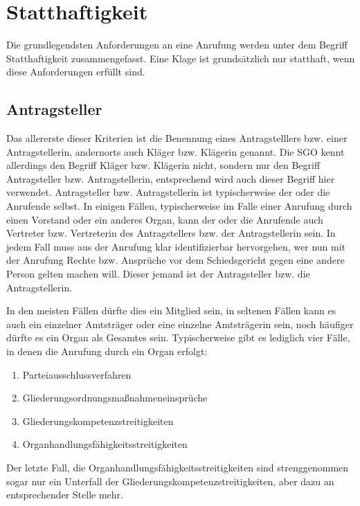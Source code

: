 \section{Statthaftigkeit}
\label{Anrufung:Statthaftigkeit}
Die grundlegendsten Anforderungen an eine Anrufung werden unter dem Begriff Statthaftigkeit zusammengefasst.
Eine Klage ist grundsätzlich nur statthaft, wenn diese Anforderungen erfüllt sind.

\subsection{Antragsteller}
\label{Anrufung:Statthaftigkeit:Antragsteller}
Das allererste dieser Kriterien ist die Benennung eines  Antragstelllers bzw. einer Antragstellerin, andernorts auch Kläger bzw. Klägerin genannt.
Die SGO kennt allerdings den Begriff Kläger bzw. Klägerin nicht, sondern nur den Begriff Antragsteller bzw. Antragstellerin, entsprechend wird auch dieser Begriff hier verwendet.
Antragsteller bzw. Antragstellerin ist typischerweise der oder die Anrufende selbst.
In einigen Fällen, typischerweise im Falle einer Anrufung durch einen Vorstand oder ein anderes Organ, kann der oder die Anrufende auch Vertreter bzw. Vertreterin des Antragstellers bzw. der Antragstellerin sein.
In jedem Fall muss aus der Anrufung klar identifizierbar hervorgehen, wer nun mit der Anrufung Rechte bzw. Ansprüche vor dem Schiedsgericht gegen eine andere Person gelten machen will.
Dieser jemand ist der Antragsteller bzw. die Antragstellerin.

In den meisten Fällen dürfte dies ein Mitglied sein, in seltenen Fällen kann es auch ein einzelner Amtsträger oder eine einzelne Amtsträgerin sein, noch häufiger dürfte es ein Organ als Gesamtes sein.
Typischerweise gibt es lediglich vier Fälle, in denen die Anrufung durch ein Organ erfolgt:
\begin{enumerate}[label=\arabic*.)]
\item Parteiausschlussverfahren
\item Gliederungsordnungsmaßnahmeneinsprüche
\item Gliederungskompetenzstreitigkeiten
\item Organhandlungsfähigkeitsstreitigkeiten
\end{enumerate}
Der letzte Fall, die Organhandlungsfähigkeitsstreitigkeiten sind strenggenommen sogar nur ein Unterfall der Gliederungskompetenzstreitigkeiten, aber dazu an entsprechender Stelle mehr.

